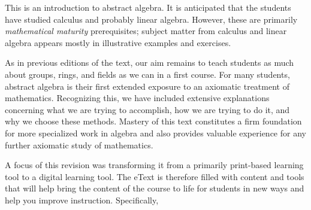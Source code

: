 \documentclass[11pt,oneside]{article}
\begin{document}




\BookNarrativetrue

\begin{BookBody}


\noindent This is an introduction to abstract algebra. It is anticipated that the students have studied calculus and probably linear algebra. However, these are primarily\textit{ mathematical ma}\textit{turity} prerequisites; subject matter from calculus and linear algebra appears mostly in illustrative examples and exercises.

As in previous editions of the text, our aim remains to teach students as much about groups, rings, and fields as we can in a first course. For many students, abstract algebra is their first extended exposure to an axiomatic treatment of mathematics. Recognizing this, we have included extensive explanations concerning what we are trying to accomplish, how we are trying to do it, and why we choose these methods. Mastery of this text constitutes a firm foundation for more specialized work in algebra and also provides valuable experience for any further axiomatic study of mathematics.




\noindent A focus of this revision was transforming it from a primarily print-based learning tool to a digital learning tool. The eText is therefore filled with content and tools that will help bring the content of the course to life for students in new ways and help you improve instruction. Specifically,


\end{BookBody}
\end{document}
